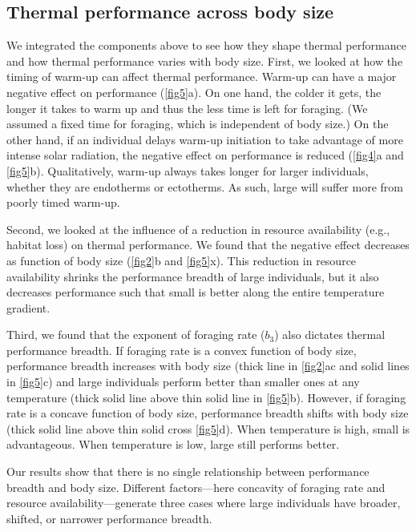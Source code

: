 \subsection*{Thermal performance across body size}
We integrated the components above to see how they shape thermal performance and how thermal performance varies with body size.
First, we looked at how the timing of warm-up can affect thermal performance.
Warm-up can have a major negative effect on performance (\cref{fig5}a).
On one hand, the colder it gets, the longer it takes to warm up and thus the less time is left for foraging.
(We assumed a fixed time for foraging, which is independent of body size.)
On the other hand, if an individual delays warm-up initiation to take advantage of more intense solar radiation, the negative effect on performance is reduced (\cref{fig4}a and \cref{fig5}b). %
Qualitatively, warm-up always takes longer for larger individuals, whether they are endotherms or ectotherms.
As such, large will suffer more from poorly timed warm-up.


Second, we looked at the influence of a reduction in resource availability (e.g., habitat loss) on thermal performance.
We found that the negative effect decreases as function of body size (\cref{fig2}b and \cref{fig5}x).
This reduction in resource availability shrinks the performance breadth of large individuals, but it also decreases performance such that small is better along the entire temperature gradient.

Third, we found that the exponent of foraging rate ($b_3$) also dictates thermal performance breadth.
If foraging rate is a convex function of body size, performance breadth increases with body size (thick line in \cref{fig2}ac and solid lines in \cref{fig5}c) and large individuals perform better than smaller ones at any temperature (thick solid line above thin solid line in \cref{fig5}b).
However, if foraging rate is a concave function of body size, performance breadth shifts with body size (thick solid line above thin solid cross \cref{fig5}d).
When temperature is high, small is advantageous.
When temperature is low, large still performs better.

Our results show that there is no single relationship between performance breadth and body size.
Different factors---here concavity of foraging  rate and resource availability---generate three cases where large individuals have broader, shifted, or narrower performance breadth.

